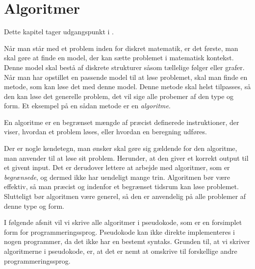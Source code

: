 \chapter{Algoritmer} \label{kap.algo}
Dette kapitel tager udgangspunkt i \citep{dmat}.

Når man står med et problem inden for diskret matematik, er det første, man skal gøre at finde en model, der kan sætte problemet i matematisk kontekst. Denne model skal bestå af diskrete strukturer såsom tællelige følger eller grafer. Når man har opstillet en passende model til at løse problemet, skal man finde en metode, som kan løse det med denne model. Denne metode skal helst tilpasses, så den kan løse det generelle problem, det vil sige alle probemer af den type og form. Et eksempel på en sådan metode er en \emph{algoritme}.
\begin{defn}
[Algoritmer] En algoritme er en begrænset mængde af præcist definerede instruktioner, der viser, hvordan et problem løses, eller hvordan en beregning udføres. 
\end{defn}

Der er nogle kendetegn, man ønsker skal gøre sig gældende for den algoritme, man anvender til at løse sit problem. Herunder, at den giver et korrekt output til et givent input. Det er derudover lettere at arbejde med algoritmer, som er \emph{begrænsede}, og dermed ikke har uendeligt mange trin. Algoritmen bør være effektiv, så man præcist og indenfor et begrænset tidsrum kan løse problemet. Slutteligt bør algoritmen være generel, så den er anvendelig på alle problemer af denne type og form.

I følgende afsnit vil vi skrive alle algoritmer i pseudokode, som er en forsimplet form for programmeringssprog. Pseudokode kan ikke direkte implementeres i nogen programmer, da det ikke har en bestemt syntaks. Grunden til, at vi skriver algoritmerne i pseudokode, er, at det er nemt at omskrive til forskellige andre programmeringssprog.







